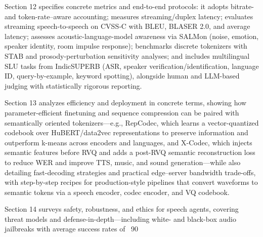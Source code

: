 Section 12 specifies concrete metrics and end-to-end protocols: it adopts bitrate- and token-rate–aware accounting; measures streaming/duplex latency; evaluates streaming speech-to-speech on CVSS‑C with BLEU, BLASER 2.0, and average latency; assesses acoustic-language-model awareness via SALMon (noise, emotion, speaker identity, room impulse response); benchmarks discrete tokenizers with STAB and prosody-perturbation sensitivity analyses; and includes multilingual SLU tasks from IndicSUPERB (ASR, speaker verification/identification, language ID, query-by-example, keyword spotting), alongside human and LLM-based judging with statistically rigorous reporting. \cite{onda2025benchmarkingprosodyencodingdiscretespeec,vashishth2024stabspeechtokenizerassessmentbenchmark,entry2025indicsuperbspeechprocessinguniversalperf,maimon2025salmonsuiteacousticlanguagemodelevaluati,zhao2024textlessstreamingspeechtranslationsemant} 



Section 13 analyzes efficiency and deployment in concrete terms, showing how parameter-efficient finetuning and sequence compression can be paired with semantically oriented tokenizers—e.g., RepCodec, which learns a vector-quantized codebook over HuBERT/data2vec representations to preserve information and outperform k-means across encoders and languages, and X-Codec, which injects semantic features before RVQ and adds a post-RVQ semantic reconstruction loss to reduce WER and improve TTS, music, and sound generation—while also detailing fast-decoding strategies and practical edge–server bandwidth trade-offs, with step-by-step recipes for production-style pipelines that convert waveforms to semantic tokens via a speech encoder, codec encoder, and VQ codebook. \cite{ye2024codecdoesmatterexploringsemanticshortcom,huang2024repcodecspeechrepresentationcodectokeniz} 



Section 14 surveys safety, robustness, and ethics for speech agents, covering threat models and defense-in-depth—including white- and black-box audio jailbreaks with average success rates of ~90%



